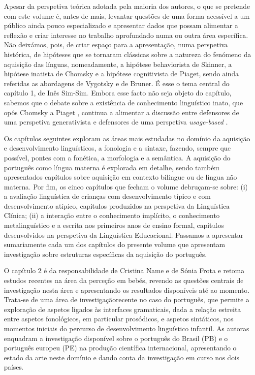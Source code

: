 \begin{refsection}
Apesar da perspetiva teórica adotada pela maioria dos autores, o que se pretende com este volume é, antes de mais, levantar questões de uma forma acessível a um público ainda pouco especializado e apresentar dados que possam alimentar a reflexão e criar interesse no trabalho aprofundado numa ou outra área específica. Não deixámos, pois, de criar espaço para a apresentação, numa perspetiva histórica, de hipóteses que se tornaram clássicas sobre a natureza do fenómeno da aquisição das línguas, nomeadamente, a hipótese behaviorista de Skinner, a hipótese inatista de Chomsky e a hipótese cognitivista de Piaget, sendo ainda referidas as abordagens de Vygotsky e de Bruner. É esse o tema central do capítulo 1, de Inês Sim-Sim. Embora esse facto não seja objeto do capítulo, sabemos que o debate sobre a existência de conhecimento linguístico inato, que opôs Chomsky a Piaget \citep{piattelli-palmarini1980}, continua a alimentar a discussão entre defensores de uma perspetiva generativista e defensores de uma perspetiva \textit{usage-based} \citep{tomasello2003}.

Os capítulos seguintes exploram as áreas mais estudadas no domínio da aquisição e desenvolvimento linguísticos, a fonologia e a sintaxe, fazendo, sempre que possível, pontes com a fonética, a morfologia e a semântica. A aquisição do português como língua materna é explorada em detalhe, sendo também apresentados capítulos sobre aquisição em contexto bilingue ou de língua não materna. Por fim, os cinco capítulos que fecham o volume debruçam-se sobre: (i) a avaliação linguística de crianças com desenvolvimento típico e com desenvolvimento atípico, capítulos produzidos na perspetiva da Linguística Clínica; (ii) a interação entre o conhecimento implícito, o conhecimento metalinguístico e a escrita nos primeiros anos de ensino formal, capítulos desenvolvidos na perspetiva da Linguística Educacional. Passamos a apresentar sumariamente cada um dos capítulos do presente volume que apresentam investigação sobre estruturas específicas da aquisição do português.

O capítulo 2 é da responsabilidade de Cristina Name e de Sónia Frota e retoma estudos recentes na área da perceção em bebés, revendo as questões centrais de investigação nesta área e apresentando os resultados disponíveis até ao momento. Trata-se de uma área de investigação\largerpage recente no caso do português, que permite a exploração de aspetos ligados às interfaces gramaticais, dada a relação estreita entre aspetos fonológicos, em particular prosódicos, e aspetos sintáticos, nos momentos iniciais do percurso de desenvolvimento linguístico infantil. As autoras enquadram a investigação disponível sobre o português do Brasil (PB) e o português europeu (PE) na produção científica internacional, apresentando o estado da arte neste domínio e dando conta da investigação em curso nos dois países.


\end{refsection}
